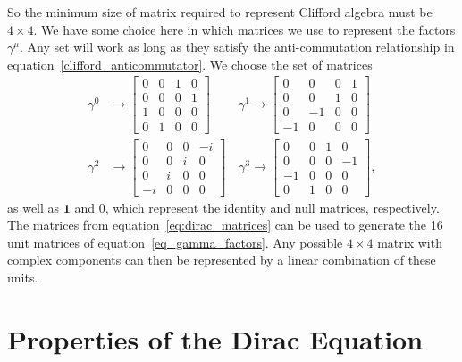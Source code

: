 \documentclass[titlepage,letterpaper,onecolumn,11pt,final]{report}
\newcommand{\gama}{\gamma^{0}}
\newcommand{\gamb}{\gamma^{1}}
\newcommand{\gamc}{\gamma^{2}}
\newcommand{\gamd}{\gamma^{3}}
\numberwithin{equation}{section}
\numberwithin{figure}{section}
\begin{document}
So the minimum size of matrix required to represent Clifford algebra must be $4 \times 4$. We have some choice here in which matrices we use to represent the factors $\gamma^{\mu}$. Any set will work as long as they satisfy the anti-commutation relationship in equation~\ref{clifford_anticommutator}. We choose the set of matrices
\begin{equation}
	\label{eq:dirac_matrices}
	\begin{split}
	\gama & \rightarrow
	\begin{bmatrix}
		0 & 0 & 1 & 0 \\
		0 & 0 & 0 & 1 \\
		1 & 0 & 0 & 0 \\
		0 & 1 & 0 & 0
	\end{bmatrix} \quad
	\quad \ \gamb \rightarrow
	\begin{bmatrix}
		0 & 0 & 0 & 1 \\
		0 & 0 & 1 & 0 \\
		0 &-1 & 0 & 0 \\
		-1& 0 & 0 & 0
	\end{bmatrix} \\
	\gamc & \rightarrow
	\begin{bmatrix}
		0 & 0 & 0 &-i \\
		0 & 0 & i & 0 \\
		0 & i & 0 & 0 \\
		-i& 0 & 0 & 0
	\end{bmatrix} \quad
	\gamd \rightarrow
	\begin{bmatrix}
		0 & 0 & 1 & 0 \\
		0 & 0 & 0 & -1 \\
		-1 & 0 & 0 & 0 \\
		0 & 1 & 0 & 0
	\end{bmatrix},
	\end{split}
\end{equation}
as well as $\mathbf{1}$ and $0$, which represent the identity and null matrices, respectively. The matrices from equation~\ref{eq:dirac_matrices} can be used to generate the 16 unit matrices of equation~\ref{eq_gamma_factors}. Any possible $4 \times 4$ matrix with complex components can then be represented by a linear combination of these units.

\section{Properties of the Dirac Equation}
\end{document}
